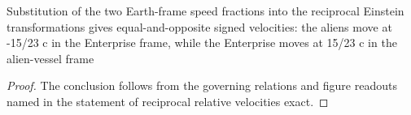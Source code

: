 \begin{lemma}
  \label{lem:physics:phyx-mini-0624:phyxminiproblems-problemphyxmini0624-reciprocal-relative-velocities-exact}
  Substitution of the two Earth-frame speed fractions into the reciprocal Einstein transformations gives equal-and-opposite signed velocities: the aliens move at -15/23 c in the Enterprise frame, while the Enterprise moves at 15/23 c in the alien-vessel frame
\end{lemma}
\begin{proof}
  The conclusion follows from the governing relations and figure readouts named in the statement of reciprocal relative velocities exact.
\end{proof}

